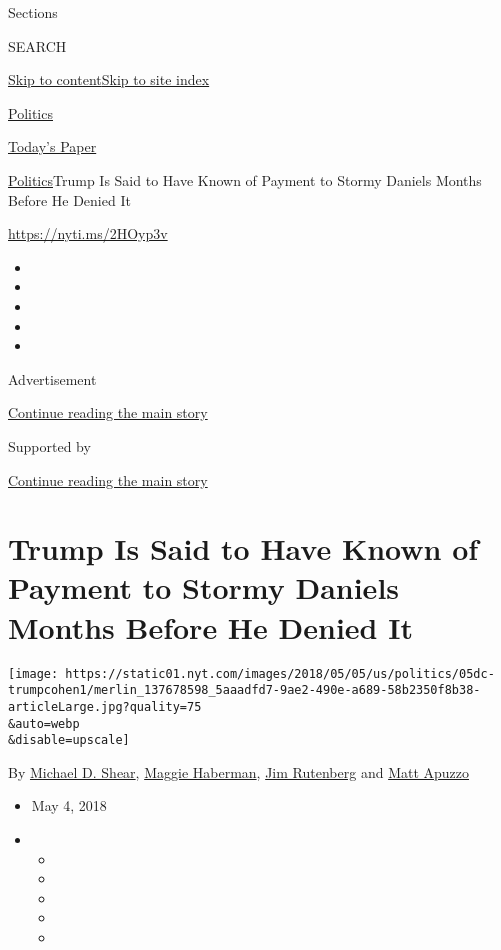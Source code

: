 Sections

SEARCH

\protect\hyperlink{site-content}{Skip to
content}\protect\hyperlink{site-index}{Skip to site index}

\href{https://www.nytimes.com/section/politics}{Politics}

\href{https://myaccount.nytimes.com/auth/login?response_type=cookie\&client_id=vi}{}

\href{https://www.nytimes.com/section/todayspaper}{Today's Paper}

\href{/section/politics}{Politics}\textbar{}Trump Is Said to Have Known
of Payment to Stormy Daniels Months Before He Denied It

\url{https://nyti.ms/2HOyp3v}

\begin{itemize}
\item
\item
\item
\item
\item
\end{itemize}

Advertisement

\protect\hyperlink{after-top}{Continue reading the main story}

Supported by

\protect\hyperlink{after-sponsor}{Continue reading the main story}

\hypertarget{trump-is-said-to-have-known-of-payment-to-stormy-daniels-months-before-he-denied-it}{%
\section{Trump Is Said to Have Known of Payment to Stormy Daniels Months
Before He Denied
It}\label{trump-is-said-to-have-known-of-payment-to-stormy-daniels-months-before-he-denied-it}}

\texttt{[image: https://static01.nyt.com/images/2018/05/05/us/politics/05dc-trumpcohen1/merlin\_137678598\_5aaadfd7-9ae2-490e-a689-58b2350f8b38-articleLarge.jpg?quality=75\\\&auto=webp\\\&disable=upscale]}

By \href{http://www.nytimes.com/by/michael-d-shear}{Michael D. Shear},
\href{http://www.nytimes.com/by/maggie-haberman}{Maggie Haberman},
\href{http://www.nytimes.com/by/jim-rutenberg}{Jim Rutenberg} and
\href{http://www.nytimes.com/by/matt-apuzzo}{Matt Apuzzo}

\begin{itemize}
\item
  May 4, 2018
\item
  \begin{itemize}
  \item
  \item
  \item
  \item
  \item
  \end{itemize}
\end{itemize}

